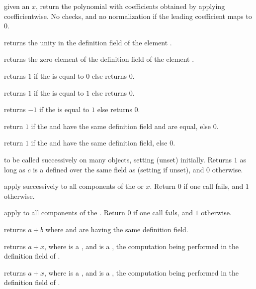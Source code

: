  given an  $x$,
return the polynomial with  coefficients obtained by
applying  coefficientwise. No checks, and no normalization
if the leading coefficient maps to $0$.

 returns the unity in the definition field of the
 element .

 returns the zero element of the definition field of
the  element .

 returns $1$ if the   is equal
to $0$ else returns $0$.

 returns $1$ if the   is equal
to $1$ else returns $0$.

 returns $-1$ if the   is equal
to $1$ else returns $0$.

 return $1$ if the   and
 have the same definition field and are equal, else $0$.

 return $1$ if the   and
 have the same definition field, else $0$.

 to be called successively on many objects,
setting  (unset) initially. Returns $1$ as long as $c$ is a
 defined over the same field as  (setting 
if unset), and $0$ otherwise.

 apply  successively to all
components of the  or  $x$. Return $0$ if one call fails,
and $1$ otherwise.

 apply  to all components
of the . Return $0$ if one call fails, and $1$ otherwise.

 returns $a+b$ where  and  are
 having the same definition field.

 returns $a+x$, where  is a
, and  is a , the computation being
performed in the definition field of .

 returns $a+x$, where  is a
, and  is a , the computation being
performed in the definition field of .

